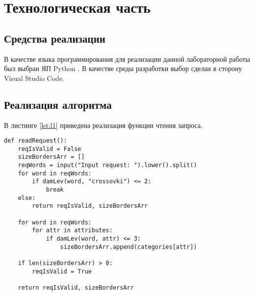 \chapter{Технологическая часть}

\section{Средства реализации}

В качестве языка программирования для реализации данной лабораторной работы был выбран ЯП Python \cite{py}. В качестве среды разработки выбор сделан в сторону Visual Studio Code.

\section{Реализация алгоритма}

В листинге \ref{lst:l1} приведена реализация функции чтения запроса.

\begin{lstlisting}[label=lst:l1,caption=Функция чтения запроса]
def readRequest():
	reqIsValid = False
	sizeBordersArr = []
	reqWords = input("Input request: ").lower().split()
	for word in reqWords:
		if damLev(word, "crossovki") <= 2:
			break
	else:
		return reqIsValid, sizeBordersArr
	
	for word in reqWords:
		for attr in attributes:
			if damLev(word, attr) <= 3:
				sizeBordersArr.append(categories[attr])
	
	if len(sizeBordersArr) > 0:
		reqIsValid = True
	
	return reqIsValid, sizeBordersArr
\end{lstlisting}



